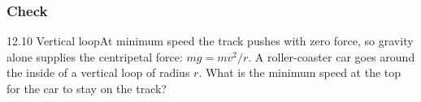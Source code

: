 \documentclass[11pt]{article}
\begin{document}
\subsubsection{Check}\mbox{}

\begin{q}{1}{2.10 Vertical loop}{At minimum speed the track pushes with zero force, so gravity alone supplies the centripetal force: $mg = mv^2/r$.}
A roller-coaster car goes around the inside of a vertical loop of radius $r$. What is the minimum speed at the top for the car to stay on the track?
\end{q}

\makekey
\end{document}
